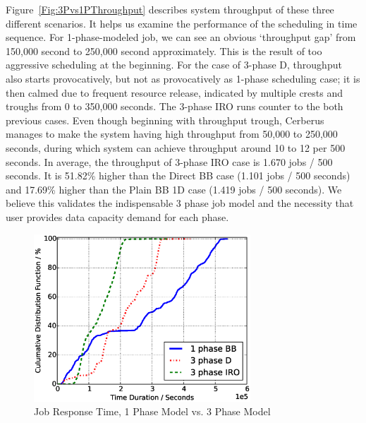 Figure~\ref{Fig:3Pvs1PThroughput} describes system throughput of these three different scenarios.
It helps us examine the performance of the scheduling in time sequence.
For 1-phase-modeled job, we can see an obvious `throughput gap'
from 150,000 second to 250,000 second approximately.
This is the result of too aggressive scheduling at the beginning.
For the case of 3-phase D, throughput also starts provocatively,
but not as provocatively as 1-phase scheduling case;
it is then calmed due to frequent resource release,
indicated by multiple crests and troughs from 0 to 350,000 seconds.
The 3-phase IRO runs counter to the both previous cases.
Even though beginning with throughput trough,
Cerberus manages to make the system having high throughput from 50,000 to 250,000 seconds,
during which system can achieve throughput around 10 to 12 per 500 seconds. 
In average, the throughput of 3-phase IRO case is 1.670 jobs / 500 seconds.
It is 51.82\% higher than the Direct BB case (1.101 jobs / 500 seconds) and
17.69\% higher than the Plain BB 1D case (1.419 jobs / 500 seconds).
We believe this validates the indispensable 3 phase job model and
the necessity that user provides data capacity demand for each phase.


\begin{figure}[!t]
        \centering
        \includegraphics[width=3.2in]{Draw3Pvs1P/1000jobs_3p_vs_1p_response}
        \caption{Job Response Time, 1 Phase Model vs. 3 Phase Model}
        \label{Fig:3Pvs1PResponse}
\end{figure}

